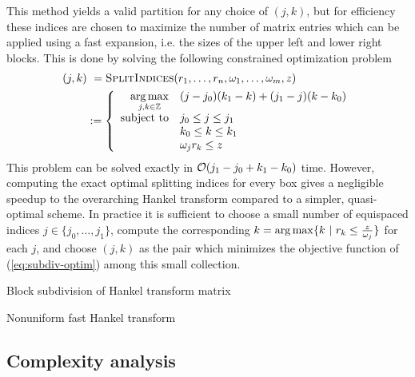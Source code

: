 This method yields a valid partition for any choice of $(j,k)$, but for
efficiency these indices are chosen to maximize the number of matrix entries
which can be applied using a fast expansion, i.e. the sizes of the upper left
and lower right blocks. This is done by solving the following constrained
optimization problem
\begin{align}
    (j,k) 
    &\ = \textsc{SplitIndices}(r_1,\dots,r_n, \omega_1,\dots,\omega_m, z) \\
    &:= \left\{
        \begin{array}{r@{\quad } l}
        \displaystyle\argmax_{j,k\in\Z} & (j-j_0)(k_1-k) + (j_1-j)(k-k_0)   \\
        \text{subject to} & j_0 \leq j \leq j_1 \\ 
        & k_0 \leq k \leq k_1 \\ 
        & \omega_j r_k \leq z
        \end{array}
    \right. \label{eq:subdiv-optim}
\end{align}
This problem can be solved exactly in $\mathcal{O}(j_1-j_0 + k_1-k_0)$ time. However,
computing the exact optimal splitting indices for every box gives a negligible
speedup to the overarching Hankel transform compared to a simpler, quasi-optimal
scheme. In practice it is sufficient to choose a small number of equispaced
indices $j \in \{j_0,\dots,j_1\}$, compute the corresponding $k = \operatorname*{arg\,max} \{k \
| \ r_k \leq \frac{z}{\omega_j}\}$ for each $j$, and choose $(j,k)$ as the pair
which minimizes the objective function of (\ref{eq:subdiv-optim}) among this
small collection.

\begin{algorithm2e}[t]
    \caption{Block subdivision of Hankel transform
    matrix}\label{alg:subdivision}
    
\end{algorithm2e}

\begin{algorithm2e}[t]
    \caption{Nonuniform fast Hankel transform}\label{alg:nufht}
    
\end{algorithm2e}

\subsection{Complexity analysis} \label{sec:complexity}


